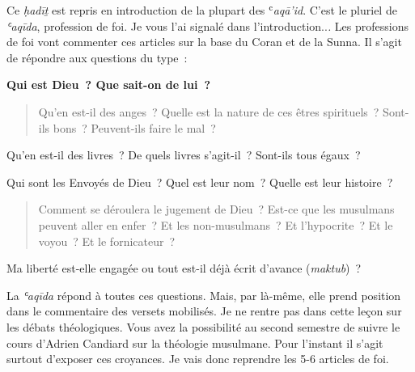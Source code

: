 






Ce \emph{ḥadīṯ} est repris en introduction de la plupart des
ʿ\emph{aqā'id}. C'est le pluriel de \emph{ʿaqīda}, profession de foi. Je
vous l'ai signalé dans l'introduction..\emph{.} Les professions de foi
vont commenter ces articles sur la base du Coran et de la Sunna. Il
s'agit de répondre aux questions du type~:

\textbf{Qui est Dieu~? Que sait-on de lui~?}

\begin{quote}
Qu'en est-il des anges~? Quelle est la nature de ces êtres spirituels~?
Sont-ils bons~? Peuvent-ils faire le mal~?
\end{quote}

Qu'en est-il des livres~? De quels livres s'agit-il~? Sont-ils tous
égaux~?

Qui sont les Envoyés de Dieu~? Quel est leur nom~? Quelle est leur
histoire~?

\begin{quote}
Comment se déroulera le jugement de Dieu~? Est-ce que les musulmans
peuvent aller en enfer~? Et les non-musulmans~? Et l'hypocrite~? Et le
voyou~? Et le fornicateur~?
\end{quote}

Ma liberté est-elle engagée ou tout est-il déjà écrit d'avance
(\emph{maktub})~?

La \emph{ʿaqīda} répond à toutes ces questions. Mais, par là-même, elle
prend position dans le commentaire des versets mobilisés. Je ne rentre
pas dans cette leçon sur les débats théologiques. Vous avez la
possibilité au second semestre de suivre le cours d'Adrien Candiard sur
la théologie musulmane. Pour l'instant il s'agit surtout d'exposer ces
croyances. Je vais donc reprendre les 5-6 articles de foi.



